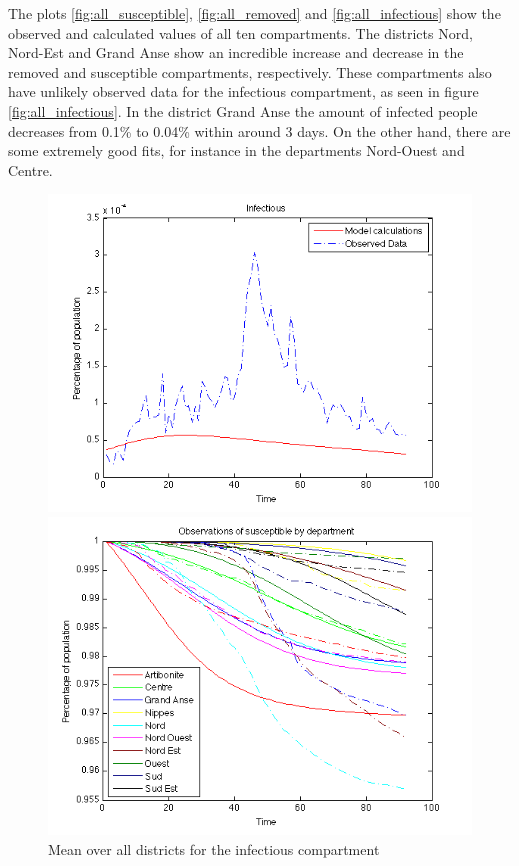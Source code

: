 \documentclass[11pt]{article}
\begin{document}
The plots \ref{fig:all_susceptible}, \ref{fig:all_removed} and \ref{fig:all_infectious} show the observed and calculated values of all ten compartments. The districts Nord, Nord-Est and Grand Anse show an incredible increase and decrease in the removed and susceptible compartments, respectively. These compartments also have unlikely observed data for the infectious compartment, as seen in figure \ref{fig:all_infectious}. In the district Grand Anse the amount of infected people decreases from  0.1\% to 0.04\% within around 3 days. On the other hand, there are some extremely good fits, for instance in the departments Nord-Ouest and Centre. 


\begin{figure}[htb]
  \begin{minipage}[t]{0.49\textwidth}
    \centering
    \includegraphics[width=\textwidth]{Bilder/infectious_mean.png} 
    \caption{Mean over all districts for the infectious compartment}
	\label{fig:mean_infectious}
  \end{minipage}
  \hspace{0.02\textwidth}
  \begin{minipage}[t]{0.49\textwidth}
    \centering
    \includegraphics[width=\textwidth]{Bilder/susceptible.png} 

\end{minipage}
\end{figure}
\end{document}
